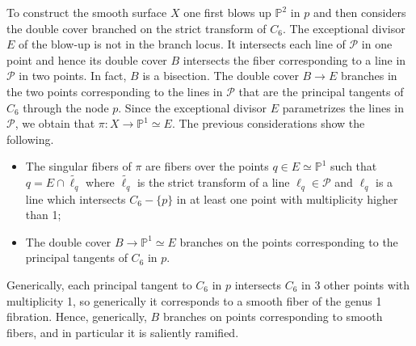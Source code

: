 \documentclass{amsart}
\theoremstyle{definition}
\numberwithin{equation}{section}
\newcommand{\ra}{\rightarrow}
\begin{document}
To construct the smooth surface $X$ one first blows up $\mathbb{P}^2$ in $p$ and then considers the double cover branched on the strict transform of $C_6$. The exceptional divisor $E$ of the blow-up is not in the branch locus. It intersects each line of $\mathcal{P}$ in one point and hence its double cover $B$ intersects the fiber corresponding to a line in $\mathcal{P}$ in two points. In fact, $B$ is a bisection. The double cover $B\ra E$ branches in the two points corresponding to the lines in $\mathcal{P}$ that are the principal tangents of $C_6$ through the node $p$. Since the exceptional divisor $E$ parametrizes the lines in $\mathcal{P}$, we obtain that $\pi:X\ra \mathbb{P}^1\simeq E$. The previous considerations show the following.
\begin{itemize}
\item The singular fibers of $\pi$ are fibers over the points $q\in E\simeq \mathbb{P}^1$ such that $q=E\cap \widetilde{\ell_q}$ where $\widetilde{\ell_q}$ is the strict transform of a line $\ell_q\in\mathcal{P}$ and $\ell_q$ is a line which intersects $C_6-\{p\}$ in at least one point with multiplicity higher than 1;
\item The double cover $B\ra\mathbb{P}^1\simeq E$ branches on the points corresponding to the principal tangents of $C_6$ in $p$.
\end{itemize}
Generically, each principal tangent to $C_6$ in $p$ intersects $C_6$ in 3 other points with multiplicity 1, so generically it corresponds to a smooth fiber of the genus 1 fibration.
Hence, generically, $B$ branches on points corresponding to smooth fibers, and in particular it is saliently ramified. 
\endproof
\end{document}
